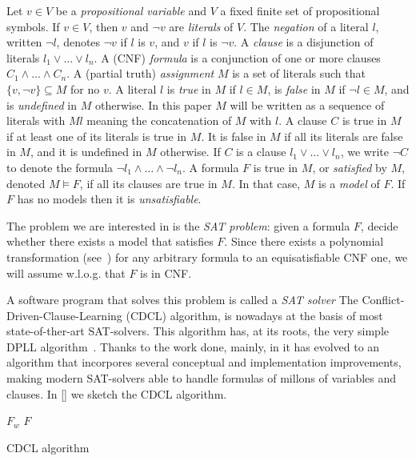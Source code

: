 \documentclass{llncs}
\begin{document}
Let $v \in V $ be a \emph{propositional variable} and $V$
 a fixed finite set of propositional symbols.  If $v \in V$,
then $v$ and $\lnot v$ are \emph{literals} of $V$.  
The \emph{negation} of a literal $l$, written $\lnot l$, denotes 
$\lnot v$ if $l$ is $v$, and $v$ if $l$ is $\lnot v$.
A \emph{clause} is a disjunction of literals $l_1 \lor\ldots\lor l_n$.
A (CNF) \emph{formula} is a conjunction of one or
more clauses $C_1 \land\ldots\land C_n$. 
 A (partial truth) \emph{assignment} $M$ is a
set of literals such that $\{ v, \lnot v \} \subseteq M$ for no $v$. A
literal $l$ is \emph{true} in $M$ if $l \in M$, is \emph{false} in $M$
if $\lnot l \in M$, and is \emph{undefined} in $M$ otherwise.  In this
paper $M$ will be written as a sequence 
 of literals with $M l$ meaning the concatenation of $M$
with $l$.   A clause $C$ is true in $M$ if at least one of its
literals is true in $M$.  It is false in $M$ if all its literals are
false in $M$, and it is undefined in $M$ otherwise. 
If $C$ is a clause $l_1
\lor\ldots\lor l_n$, we write $\lnot C$ to denote the formula $\lnot
l_1 \land\ldots\land \lnot l_n$.
A formula $F$ is true in $M$, or
\emph{satisfied} by $M$, denoted $M\models F$, if all its clauses are
true in $M$.  In that case, $M$ is a \emph{model} of $F$.  If $F$ has
no models then it is \emph{unsatisfiable}.  

The problem we are interested in is the \emph{SAT problem}: given a
formula $F$, decide whether there exists a model that satisfies
$F$.
Since there exists a polynomial transformation
(see~\cite{Tseitin1968}) for any arbitrary formula to an
equisatisfiable CNF one, we will assume w.l.o.g. that $F$ is in CNF.

A software program that solves this problem is called a \emph{SAT solver}
The Conflict-Driven-Clause-Learning (CDCL) algorithm, is nowadays at the 
basis of most state-of-ther-art SAT-solvers\cite{gluclose,plingeling,cryptominisat}. 
This algorithm has, at its roots, the very 
simple DPLL algorithm~\cite{Davisetal1962CACM}. Thanks to the work done, mainly,
 in \cite{relsat,Chaff2001, GRASP1999IEEE, ZhangStickel1996IMATH, EenSorensson2003SAT,
picosat2008,} it has evolved
 to an algorithm that incorpores several conceptual and implementation 
improvements, making modern SAT-solvers able to handle formulas of millons 
of variables and clauses. In \ref{} we sketch the CDCL algorithm.

\begin{algorithm}
 \BlankLine
  $F_w$ \assign $F$\;
\caption{CDCL algorithm}
\label{alg:CDCL}
\end{algorithm}
\end{document}
